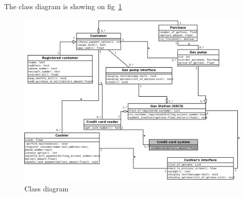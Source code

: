 

The class diagram is showing on fig~\ref{fig:class-diagram}

\begin{landscape}
\begin{figure}[!h]
\includegraphics[width=\linewidth]{drafts/class_diagram.png}
\caption{Class diagram}
\label{fig:class-diagram}
\end{figure}
\end{landscape}

